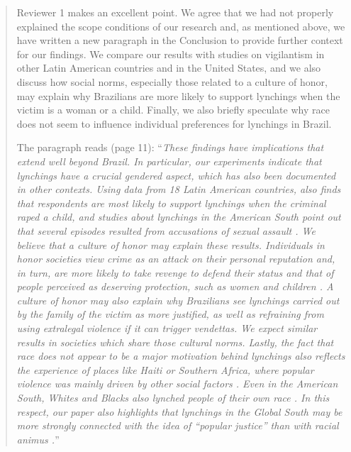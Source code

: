\documentclass[a4paper,12pt]{article}
\begin{document}
\begin{quote}
  
Reviewer 1 makes an excellent point. We agree that we had not properly
explained the scope conditions of our research and, as mentioned above, we have
written a new paragraph in the Conclusion to provide further context for our
findings. We compare our results with studies on vigilantism in other Latin
American countries and in the United States, and we also discuss how social
norms, especially those related to a culture of honor, may explain why
Brazilians are more likely to support lynchings when the victim is a woman or a
child. Finally, we also briefly speculate why race does not seem to influence
individual preferences for lynchings in Brazil.

The paragraph reads (page 11): ``\textit{These findings have implications that
  extend well beyond Brazil. In particular, our experiments indicate that
  lynchings have a crucial gendered aspect, which has also been documented in
  other contexts. Using data from 18 Latin American countries,
  \citet{nivette2016institutional} also finds that respondents are most likely
  to support lynchings when the criminal raped a child, and studies about
  lynchings in the American South point out that several episodes resulted from
  accusations of sexual assault \citep{jacquet2013giles, smaangs2020race}. We
  believe that a culture of honor may explain these results. Individuals in
  honor societies view crime as an attack on their personal reputation and, in
  turn, are more likely to take revenge to defend their status and that of
  people perceived as deserving protection, such as women and children
  \citep{nisbett2018culture}. A culture of honor may also explain why
  Brazilians see lynchings carried out by the family of the victim as more
  justified, as well as refraining from using extralegal violence if it can
  trigger vendettas. We expect similar results in societies which share those
  cultural norms. Lastly, the fact that race does not appear to be a major
  motivation behind lynchings also reflects the experience of places like Haiti
  or Southern Africa, where popular violence was mainly driven by other social
  factors \citep{berg2011globalizing, jung2020lynching}. Even in the American
  South, Whites and Blacks also lynched people of their own race
  \citep{beck1997race}. In this respect, our paper also highlights that
lynchings in the Global South may be more strongly connected with the idea of
``popular justice'' than with racial animus \citep{martins2015linchamentos}.}''


\end{quote}
\end{document}
